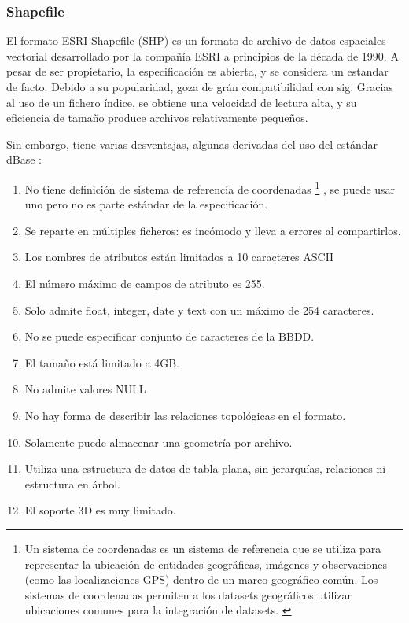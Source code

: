 \subsubsection{Shapefile} El formato ESRI Shapefile (SHP) es un formato de archivo de datos espaciales vectorial
desarrollado por la compañía ESRI a principios de la década de 1990. A pesar de ser propietario, la
especificación es abierta, y se considera un estandar de facto. Debido a su popularidad, goza de grán
compatibilidad con sig. Gracias al uso de un fichero índice, se obtiene una velocidad de lectura alta, y su
eficiencia de tamaño produce archivos relativamente pequeños.

Sin embargo, tiene varias desventajas, algunas derivadas del uso del estándar dBase \cite{shapefile-specs}
\cite{shapefile-no}: 

\begin{enumerate} 
    \item No tiene definición de sistema de referencia de coordenadas \footnote{Un sistema de
            coordenadas es un sistema de referencia que se utiliza para representar la ubicación de entidades
            geográficas, imágenes y observaciones (como las localizaciones GPS) dentro de un marco geográfico
            común. Los sistemas de coordenadas permiten a los datasets geográficos utilizar ubicaciones comunes
            para la integración de datasets. \cite{coordenadas}} 
        , se puede usar uno pero no es parte estándar de la especificación.     
    \item Se reparte en múltiples ficheros: es incómodo y lleva a errores al compartirlos.
    \item Los nombres de atributos están limitados a 10 caracteres ASCII 
    \item El número máximo de campos de atributo es 255.  
    \item Solo admite float, integer, date y text con un máximo de 254 caracteres.  
    \item No se puede especificar conjunto de caracteres de la BBDD.  
    \item El tamaño está limitado a 4GB.  
    \item No admite valores NULL 
    \item No hay forma de describir las relaciones topológicas en el formato.  
    \item Solamente puede almacenar una geometría por archivo.  
    \item Utiliza una estructura de datos de tabla plana, sin jerarquías, relaciones ni estructura en árbol.  
    \item El soporte 3D es muy limitado.  
\end{enumerate}

